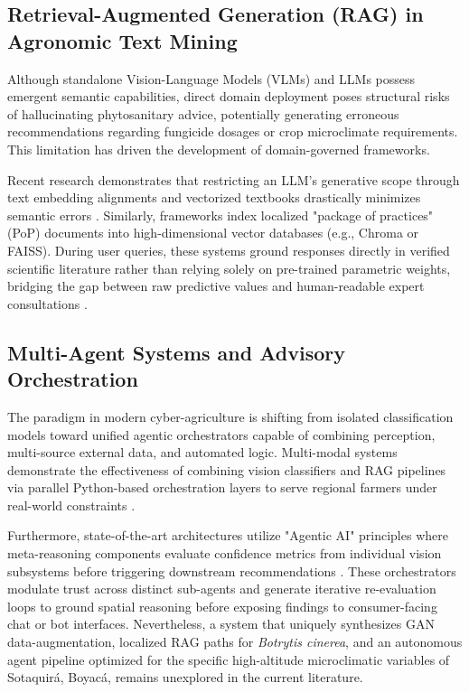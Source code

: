\documentclass[11pt]{article}
\begin{document}
\subsection{Retrieval-Augmented Generation (RAG) in Agronomic Text Mining}
Although standalone Vision-Language Models (VLMs) and LLMs possess emergent semantic capabilities, direct domain deployment poses structural risks of hallucinating phytosanitary advice, potentially generating erroneous recommendations regarding fungicide dosages or crop microclimate requirements. This limitation has driven the development of domain-governed frameworks. 

Recent research demonstrates that restricting an LLM's generative scope through text embedding alignments and vectorized textbooks drastically minimizes semantic errors \cite{ravindran_agrollm}. Similarly, frameworks index localized "package of practices" (PoP) documents into high-dimensional vector databases (e.g., Chroma or FAISS). During user queries, these systems ground responses directly in verified scientific literature rather than relying solely on pre-trained parametric weights, bridging the gap between raw predictive values and human-readable expert consultations \cite{sawant_empowering}.

\subsection{Multi-Agent Systems and Advisory Orchestration}
The paradigm in modern cyber-agriculture is shifting from isolated classification models toward unified agentic orchestrators capable of combining perception, multi-source external data, and automated logic. Multi-modal systems demonstrate the effectiveness of combining vision classifiers and RAG pipelines via parallel Python-based orchestration layers to serve regional farmers under real-world constraints \cite{sanjay_agriadvisor}.

Furthermore, state-of-the-art architectures utilize "Agentic AI" principles where meta-reasoning components evaluate confidence metrics from individual vision subsystems before triggering downstream recommendations \cite{roumeliotis2025agentic}. These orchestrators modulate trust across distinct sub-agents and generate iterative re-evaluation loops to ground spatial reasoning before exposing findings to consumer-facing chat or bot interfaces. Nevertheless, a system that uniquely synthesizes GAN data-augmentation, localized RAG paths for \textit{Botrytis cinerea}, and an autonomous agent pipeline optimized for the specific high-altitude microclimatic variables of Sotaquirá, Boyacá, remains unexplored in the current literature.
\end{document}
